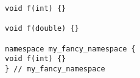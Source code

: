 \begin{lstlisting}[title=\href{https://godbolt.org/z/jWY14x}{\texttt{godbolt.org/z/jWY14x}}]
void f(int) {}

void f(double) {}

namespace my_fancy_namespace {
void f(int) {}
} // my_fancy_namespace
\end{lstlisting}
